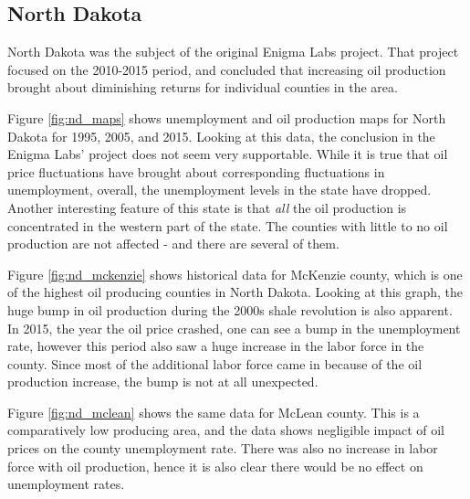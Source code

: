 \documentclass[11pt,letterpaper]{article}
\begin{document}
\subsection{North Dakota}

North Dakota was the subject of the original Enigma Labs project. That project focused on the 2010-2015 period, and concluded that increasing oil production brought about diminishing returns for individual counties in the area. 

Figure \ref{fig:nd_maps} shows unemployment and oil production maps for North Dakota for 1995, 2005, and 2015. Looking at this data, the conclusion in the Enigma Labs' project does not seem very supportable. While it is true that oil price fluctuations have brought about corresponding fluctuations in unemployment, overall, the unemployment levels in the state have dropped. Another interesting feature of this state is that \emph{all} the oil production is concentrated in the western part of the state. The counties with little to no oil production are not affected - and there are several of them.

Figure \ref{fig:nd_mckenzie} shows historical data for McKenzie county, which is one of the highest oil producing counties in North Dakota. Looking at this graph, the huge bump in oil production during the 2000s shale revolution is also apparent. In 2015, the year the oil price crashed, one can see a bump in the unemployment rate, however this period also saw a huge increase in the labor force in the county. Since most of the additional labor force came in because of the oil production increase, the bump is not at all unexpected.

Figure \ref{fig:nd_mclean} shows the same data for McLean county. This is a comparatively low producing area, and the data shows negligible impact of oil prices on the county unemployment rate. There was also no increase in labor force with oil production, hence it is also clear there would be no effect on unemployment rates.
\end{document}
